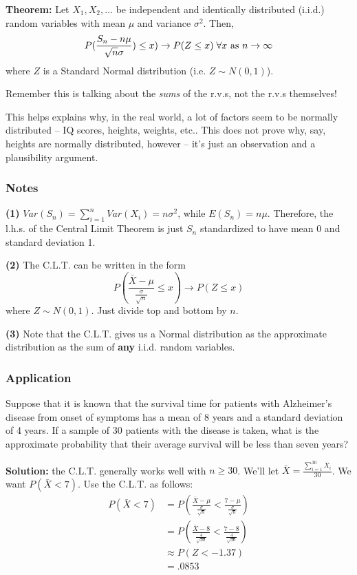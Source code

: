 \documentclass[12pt]{article}
\begin{document}
\textbf{Theorem:} Let $X_1, X_2, \dots$ be independent and identically distributed (i.i.d.) random variables with mean $\mu$ and variance $\sigma^2$. Then, 
\[
    P(\frac{S_n - n \mu}{\sqrt{n} \sigma}) \leq x) \rightarrow P(Z \leq x) \; \forall x \textnormal{ as } n \to \infty
\]
where $Z$ is a Standard Normal distribution (i.e. $Z \sim N(0,1)$). 

Remember this is talking about the \emph{sums} of the r.v.s, not the r.v.s themselves!

This helps explains why, in the real world, a lot of factors seem to be normally distributed -- IQ scores, heights, weights, etc.. This does not prove why, say, heights are normally distributed, however -- it's just an observation and a plausibility argument.

\subsubsection{Notes}
\textbf{(1)} $Var(S_n) = \sum_{i = 1}^n Var(X_i) = n \sigma^2$, while $E(S_n) = n \mu$. Therefore, the l.h.s. of the Central Limit Theorem is just $S_n$ standardized to have mean 0 and standard deviation 1.

\textbf{(2)} The C.L.T. can be written in the form
\[
    P(\frac{\bar{X} - \mu}{\frac{\sigma}{\sqrt{n}}} \leq x) \rightarrow P(Z \leq x)
\]
where $Z \sim N(0,1)$. Just divide top and bottom by $n$.

\textbf{(3)} Note that the C.L.T. gives us a Normal distribution as the approximate  distribution as the sum of \textbf{any} i.i.d. random variables. 

\subsubsection{Application}
Suppose that it is known that the survival time for patients with Alzheimer's disease from onset of symptoms has a mean of 8 years and a standard deviation of 4 years. If a sample of 30 patients with the disease is taken, what is the approximate probability that their average survival will be less than seven years?

\textbf{Solution:} the C.L.T. generally works well with $n \geq 30$. We'll let $\bar{X} = \frac{\sum_{i=1}^{30} X_i}{30}$. We want $P(\bar{X} < 7)$. Use the C.L.T. as follows:
\begin{align*}
    P(\bar{X} < 7) &= P(\frac{\bar{X} - \mu}{\frac{\sigma}{\sqrt{n}}} < \frac{7 - \mu}{\frac{\sigma}{\sqrt{n}}}) \\
        &= P(\frac{\bar{X} - 8}{\frac{4}{\sqrt{30}}} < \frac{7 - 8}{\frac{4}{\sqrt{30}}}) \\
        &\approx P(Z < -1.37) \\
        &= .0853
\end{align*}
\end{document}
